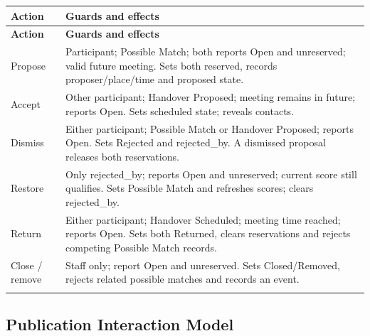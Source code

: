 \documentclass[12pt,a4paper,oneside]{report}
\begin{document}
\begin{longtable}{@{}P{0.19\dimexpr\textwidth-12pt\relax}P{0.81\dimexpr\textwidth-12pt\relax}@{}}

\toprule \textbf{Action} & \textbf{Guards and effects} \\ \midrule\endfirsthead

\toprule \textbf{Action} & \textbf{Guards and effects} \\ \midrule\endhead

\bottomrule\endfoot

Propose & Participant; Possible Match; both reports Open and unreserved; valid future meeting. Sets both reserved, records proposer/place/time and proposed state. \\ \addlinespace[3pt]

Accept & Other participant; Handover Proposed; meeting remains in future; reports Open. Sets scheduled state; reveals contacts. \\ \addlinespace[3pt]

Dismiss & Either participant; Possible Match or Handover Proposed; reports Open. Sets Rejected and rejected\_by. A dismissed proposal releases both reservations. \\ \addlinespace[3pt]

Restore & Only rejected\_by; reports Open and unreserved; current score still qualifies. Sets Possible Match and refreshes scores; clears rejected\_by. \\ \addlinespace[3pt]

Return & Either participant; Handover Scheduled; meeting time reached; reports Open. Sets both Returned, clears reservations and rejects competing Possible Match records. \\ \addlinespace[3pt]

Close / remove & Staff only; report Open and unreserved. Sets Closed/Removed, rejects related possible matches and records an event. \\ \addlinespace[3pt]

\end{longtable}


\subsection{Publication Interaction Model}
\end{document}
